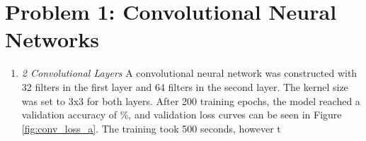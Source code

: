 \documentclass{article}
\begin{document}


\section{Problem 1: Convolutional Neural Networks}
\begin{enumerate}[label=\alph*. ]
    \item \textit{2 Convolutional Layers}
     A convolutional neural network was constructed with 32 filters in the first layer and 64 filters in the second layer. The kernel size was set to 3x3 for both layers. After 200 training epochs, the model reached a validation accuracy of \%, and validation loss curves can be seen in Figure \ref{fig:conv_loss_a}. The training took 500 seconds, however t

\end{enumerate}
\end{document}
